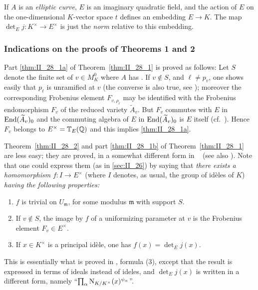 \begin{ex}
If $A$ is an \emph{elliptic curve}, $E$ is an imaginary quadratic field, and
the action of $E$ on the one-dimensional $K$-vector space $t$ defines an
embedding $E \to K$. The map $\det_E j\colon K^\times \to E^\times$ is just the
\emph{norm} relative to this embedding.
\end{ex}

\subsubsection*{Indications on the proofs of Theorems 1 and 2}
Part \ref{thm:II_28_1a} of Theorem~\ref{thm:II_28_1} is proved as follows: Let
$S$ denote the finite set of $v \in M_K^0$ where $A$ has . If $v \notin S$, and
\dpage
$\ell \ne p_v$, one shows easily that $p_\ell$ is unramified at $v$ (the
converse is also true, see \cite{32}); moreover the corresponding Frobenius
element $F_{v, \rho_\ell}$ may be identified with the Frobenius endomorphism
$F_v$ of the reduced variety $\widetilde{A}_v$. But $F_v$ commutes with $E$ in
$\operatorname{End}(\widetilde{A}_v)_0$ and the commuting algebra of $E$ in
$\operatorname{End}(\widetilde{A}_v)_0$ is $E$ itself (cf.\ \cite[39]{34}). Hence $F_v$
belongs to $E^\times = \mathbb{T}_E(\mathbb{Q})$ and this implies \ref{thm:II_28_1a}.

Theorem~\ref{thm:II_28_2} and part \ref{thm:II_28_1b} of
Theorem~\ref{thm:II_28_1} are less easy; they are proved, in a somewhat
different form in \citeauthor{34}~\cite{34} (see also \cite{32}). Note that one
could express them (as in \ref{sec:II_26}) by saying that \emph{there exists a
homomorphism} $f\colon I \to E^\times$ (where $I$ denotes, as usual, the group
of idèles of $K$) \emph{having the following properties:}
\begin{enumerate}
\item $f$ is trivial on $U_{\mathfrak{m}}$, for some modulus $\mathfrak{m}$
	with support $S$.
\item If $v \notin S$, the image by $f$ of a uniformizing parameter at
	$v$ is the Frobenius element $F_v \in E^\times$.
\item If $x \in K^\times$ is a principal idèle, one has $f(x) = \det_E j(x)$.
\end{enumerate}
This is essentially what is proved in \cite[148]{34}, formula (3),
except that the result is expressed in terms of ideals instead of
ideles, and $\det_E j(x)$ is written in a different form, namely
``$ \prod_{\alpha} \operatorname{N}_{K/K^\times}(x)^{\psi_\alpha} $''.

